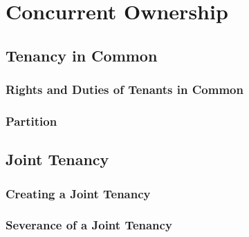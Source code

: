 \chapter{Concurrent Ownership}



%


\section{Tenancy in Common}




\subsection{Rights and Duties of Tenants in Common}






\begin{questions}

\end{questions}



\subsection{Partition}




\begin{questions}

\end{questions}



\section{Joint Tenancy}




\subsection{Creating a Joint Tenancy}




\subsection{Severance of a Joint Tenancy}






\begin{questions}

\end{questions}


